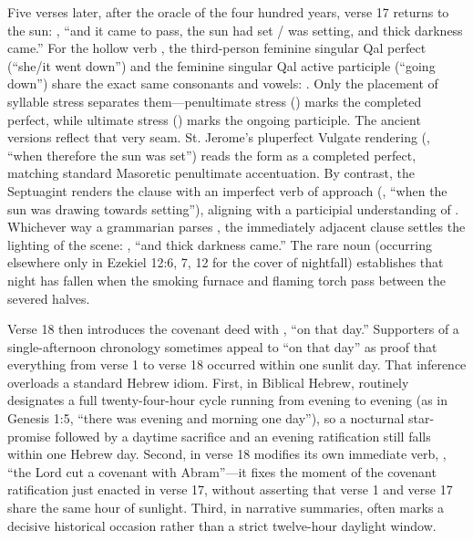 Five verses later, after the oracle of the four hundred years, verse 17 returns to the sun: , ``and it came to pass, the sun had set / was setting, and thick darkness came.'' For the hollow verb , the third-person feminine singular Qal perfect (``she/it went down'') and the feminine singular Qal active participle (``going down'') share the exact same consonants and vowels: . Only the placement of syllable stress separates them---penultimate stress () marks the completed perfect, while ultimate stress () marks the ongoing participle. The ancient versions reflect that very seam. St. Jerome's pluperfect Vulgate rendering (, ``when therefore the sun was set'') reads the form as a completed perfect, matching standard Masoretic penultimate accentuation. By contrast, the Septuagint renders the clause with an imperfect verb of approach (, ``when the sun was drawing towards setting''), aligning with a participial understanding of . Whichever way a grammarian parses , the immediately adjacent clause settles the lighting of the scene: , ``and thick darkness came.'' The rare noun  (occurring elsewhere only in Ezekiel 12:6, 7, 12 for the cover of nightfall) establishes that night has fallen when the smoking furnace and flaming torch pass between the severed halves.

Verse 18 then introduces the covenant deed with , ``on that day.'' Supporters of a single-afternoon chronology sometimes appeal to ``on that day'' as proof that everything from verse 1 to verse 18 occurred within one sunlit day. That inference overloads a standard Hebrew idiom. First, in Biblical Hebrew,  routinely designates a full twenty-four-hour cycle running from evening to evening (as in Genesis 1:5, ``there was evening and morning one day''), so a nocturnal star-promise followed by a daytime sacrifice and an evening ratification still falls within one Hebrew day. Second,  in verse 18 modifies its own immediate verb, , ``the Lord cut a covenant with Abram''---it fixes the moment of the covenant ratification just enacted in verse 17, without asserting that verse 1 and verse 17 share the same hour of sunlight. Third, in narrative summaries,  often marks a decisive historical occasion rather than a strict twelve-hour daylight window.

